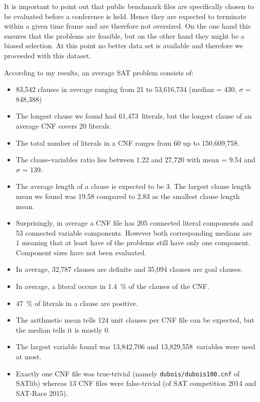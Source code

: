 It is important to point out that public benchmark files are specifically chosen
to be evaluated before a conference is held. Hence they are expected to terminate
within a given time frame and are therefore not oversized. On the one hand this
ensures that the problems are feasible, but on the other hand they might be a
biased selection. At this point no better data set is available and therefore
we proceeded with this dataset.

According to my results, an average SAT problem consists of:
\begin{itemize}
  \item 83,542 clauses in average ranging from 21 to 53,616,734 (median = 430, $\sigma$ = 848,388)
  \item The longest clause we found had 61,473~literals, but the longest clause of an average CNF covers 20 literals.
  \item The total number of literals in a CNF ranges from 60 up to 150,609,758.
  \item The clause-variables ratio lies between 1.22 and 27,720 with mean = 9.54 and $\sigma$ = 139.
  \item The average length of a clause is expected to be 3. The largest clause length mean we found was 19.58 compared to 2.83 as the smallest clause length mean.
  \item Surprisingly, in average a CNF file has 205 connected literal components and 53 connected variable components. However both corresponding medians are $1$ meaning that at least have of the problems still have only one component. Component sizes have not been evaluated.
  \item In average, 32,787 clauses are definite and 35,094 clauses are goal clauses.
  \item In average, a literal occurs in 1.4~\% of the clauses of the CNF.
  \item 47~\% of literals in a clause are positive.
  \item The arithmetic mean tells 124 unit clauses per CNF file can be expected, but the median tells it is mostly 0.
  \item The largest variable found was 13,842,706 and 13,829,558~variables were used at most.
  \item Exactly one CNF file was true-trivial (namely \texttt{dubois/dubois100.cnf} of SATlib)
    whereas 13 CNF files were false-trivial (of SAT competition 2014 and SAT-Race 2015).
\end{itemize}
